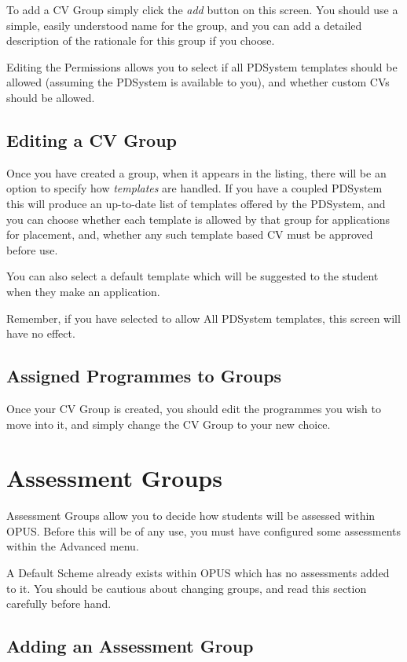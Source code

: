 \documentclass[12 pt]{book}
\begin{document}
To add a CV Group simply click the \emph{add} button on this screen. You should
use a simple, easily understood name for the group, and you can add a detailed
description of the rationale for this group if you choose.

Editing the Permissions allows you to select if all PDSystem templates should 
be allowed (assuming the PDSystem is available to you), and whether custom CVs
should be allowed.

\subsection{Editing a CV Group}

Once you have created a group, when it appears in the listing, there will be
an option to specify how \emph{templates} are handled. If you have a coupled
PDSystem this will produce an up-to-date list of templates offered by the
PDSystem, and you can choose whether each template is allowed by that group
for applications for placement, and, whether any such template based CV must 
be approved before use.

You can also select a default template which will be suggested to the student
when they make an application.

Remember, if you have selected to allow All PDSystem templates, this screen
will have no effect.

\subsection{Assigned Programmes to Groups}

Once your CV Group is created, you should edit the programmes you wish to move
into it, and simply change the CV Group to your new choice.

\section{Assessment Groups}

Assessment Groups allow you to decide how students will be assessed within
OPUS. Before this will be of any use, you must have configured some assessments
within the Advanced menu.

A Default Scheme already exists within OPUS which has no assessments added to
it. You should be cautious about changing groups, and read this section
carefully before hand.

\subsection{Adding an Assessment Group}
\end{document}
